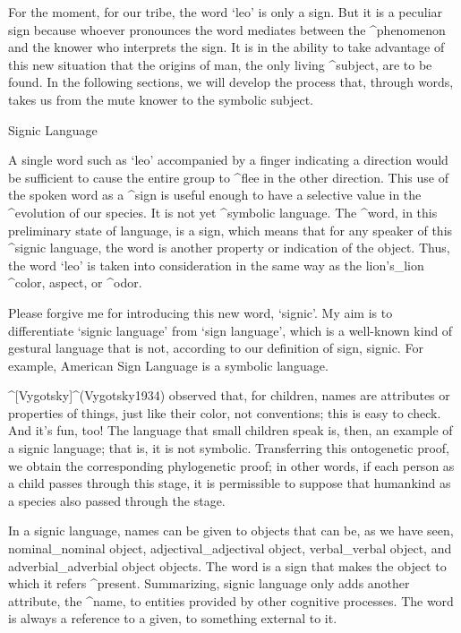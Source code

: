 For the moment, for our tribe, the word `leo' is only a sign. But it is
a peculiar sign because whoever pronounces the word mediates between the
^{phenomenon} and the knower who interprets the sign. It is in the
ability to take advantage of this new situation that the origins of man,
the only living ^{subject}, are to be found. In the following sections,
we will develop the process that, through words, takes us from the mute
knower to the symbolic subject.


\Section Signic Language

A single word such as `leo' accompanied by a finger indicating a
direction would be sufficient to cause the entire group to ^{flee} in
the other direction. This use of the spoken word as a ^{sign} is useful
enough to have a selective value in the ^{evolution} of our species. It
is not yet ^{symbolic language}. The ^{word}, in this preliminary state
of language, is a sign, which means that for any speaker of this
^{signic language}, the word is another property or indication of the
object. Thus, the word `leo' is taken into consideration in the same way
as the lion's_{lion} ^{color}, aspect, or ^{odor}.

Please forgive me for introducing this new word, `signic'. My aim is to
differentiate `signic language' from `sign language', which is a
well-known kind of gestural language that is not, according to our
definition of sign, signic. For example, American Sign Language is a
symbolic language.

^[Vygotsky]^(Vygotsky1934) observed that, for children, names are
attributes or properties of things, just like their color, not
conventions; this is easy to check. And it's fun, too!  The language
that small children speak is, then, an example of a signic language;
that is, it is not symbolic. Transferring this ontogenetic proof, we
obtain the corresponding phylogenetic proof; in other words, if each
person as a child passes through this stage, it is permissible to
suppose that humankind as a species also passed through the stage.

In a signic language, names can be given to objects that can be, as we
have seen, nominal_{nominal object}, adjectival_{adjectival object},
verbal_{verbal object}, and adverbial_{adverbial object} objects. The
word is a sign that makes the object to which it refers ^{present}.
Summarizing, signic language only adds another attribute, the ^{name},
to entities provided by other cognitive processes. The word is always a
reference to a given, to something external to it.

